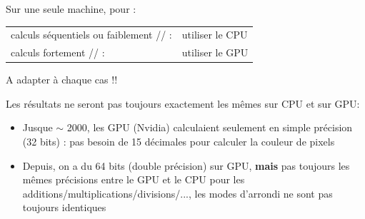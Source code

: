 \documentclass[usenames,dvipsnames]{beamer}
\begin{document}
\begin{frame}
Sur une seule machine, pour :
\begin{tabular}{ll}
calculs séquentiels ou faiblement // :& utiliser le CPU \\
calculs fortement // :& utiliser le GPU
\end{tabular}

\vfill

A adapter à chaque cas !!

\vfill

Les résultats ne seront pas toujours exactement les mêmes sur CPU et sur GPU:
\begin{itemize}
\item Jusque $\sim$ 2000, les GPU (Nvidia) calculaient seulement en simple précision (32 bits) : pas besoin de 15 décimales pour calculer la couleur de pixels
\item Depuis, on a du 64 bits (double précision) sur GPU, {\bfseries mais} pas toujours les mêmes précisions entre le GPU et le CPU pour les additions/multiplications/divisions/..., les modes d'arrondi ne sont pas toujours identiques
\end{itemize}

\end{frame}
\end{document}
